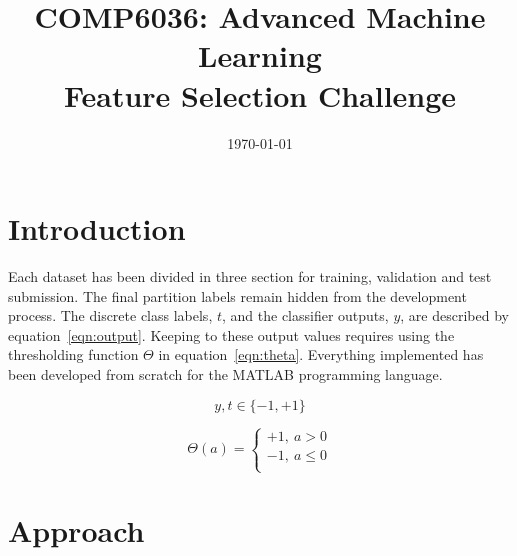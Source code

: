\documentclass{ecsarticle}     %
\begin{document}
\frontmatter
\title      {COMP6036: Advanced Machine Learning\\
            Feature Selection Challenge}
      
\addresses  {\deptname\\\univname}

\date       {\today}
\subject    {}
\keywords   {}
\maketitle


\begin{abstract}
\end{abstract}

\mainmatter


\section{Introduction}

Each dataset has been divided in three section for training, validation and test submission.
The final partition labels remain hidden from the development process.
The discrete class labels, $t$, and the classifier outputs, $y$, are described by equation~\eqref{eqn:output}.
Keeping to these output values requires using the thresholding function $\Theta$ in equation~\eqref{eqn:theta}. 
Everything implemented has been developed from scratch for the MATLAB programming language. 


\begin{equation}
	y,t \in \{-1,+1\}
	\label{eqn:output}
\end{equation}

\begin{equation}
	\Theta(a) = \left\{ 
      \begin{array}{l}
         +1,\:a > 0\\
         -1,\:a \leq 0\\
      \end{array} \right.	
	\label{eqn:theta}
\end{equation}

\section{Approach}
\end{document}
